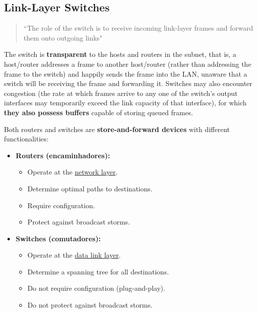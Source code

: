 \clearpage
\subsection[5.5 Link-Layer Switches]{\hspace*{0.075 em}\raisebox{0.2 em}{$\pmb{\drsh}$} Link-Layer Switches}
\label{subsec:switches}

\begin{quote}
    ``The role of the switch is to receive incoming link-layer frames and forward them onto outgoing links"\cite{Kurose2017}
\end{quote}

\noindent The switch is \textbf{transparent} to the hosts and routers in the subnet, that is, a host/router addresses a frame to another host/router (rather than addressing the frame to the switch) and happily sends the frame into the LAN, unaware that a switch will be receiving the frame and forwarding it. Switches may also encounter congestion (the rate at which frames arrive to any one of the switch’s output interfaces may temporarily exceed the link capacity of that interface), for which \textbf{they also possess buffers} capable of storing queued frames.

\vspace{1em}
\noindent Both routers and switches are \textbf{store-and-forward devices} with different functionalities:
\begin{itemize}[noitemsep, nolistsep]
    \item \textbf{Routers (encaminhadores):}
    \begin{itemize}[noitemsep, nolistsep]
        \item Operate at the \underline{network layer}.
        \item Determine optimal paths to destinations.
        \item Require configuration.
        \item Protect against broadcast storms.
    \end{itemize}

    \vspace{0.25em}
    \item \textbf{Switches (comutadores):}
    \begin{itemize}[noitemsep, nolistsep]
        \item Operate at the \underline{data link layer}.
        \item Determine a spanning tree for all destinations.
        \item Do not require configuration (plug-and-play).
        \item Do not protect against broadcast storms.
    \end{itemize}
\end{itemize}

